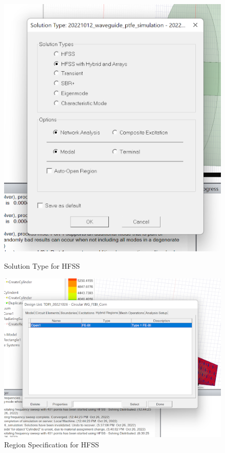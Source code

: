 \documentclass[a4paper,12pt]{report}
\begin{document}
\begin{figure}
  \centering
  \begin{minipage}{0.45\textwidth}
    \centering
    \includegraphics[clip, keepaspectratio, width=0.9\linewidth]{img/hfss_solution_type.png}
    \caption{Solution Type for HFSS}
    \label{fig:hfss_solution_type}
  \end{minipage}\hfill
  \begin{minipage}{0.45\textwidth}
    \centering
    \includegraphics[clip, keepaspectratio, width=0.9\linewidth]{img/hfss_febi_hybrid_region.png}
    \caption{Region Specification for HFSS}
    \label{fig:hfss_febi_hybrid_region}
  \end{minipage}\hfill
\end{figure}
\end{document}
